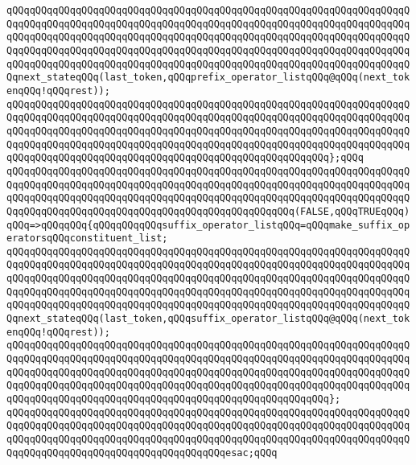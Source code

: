 \newline
\verb|qQQqqQQqqQQqqQQqqQQqqQQqqQQqqQQqqQQqqQQqqQQqqQQqqQQqqQQqqQQqqQQqqQQqqQQqqQQqqQQqqQQqqQQqqQQqqQQqqQQqqQQqqQQqqQQqqQQqqQQqqQQqqQQqqQQqqQQqqQQqqQQqqQQqqQQqqQQqqQQqqQQqqQQqqQQqqQQqqQQqqQQqqQQqqQQqqQQqqQQqqQQqqQQqqQQqqQQqqQQqqQQqqQQqqQQqqQQqqQQqqQQqqQQqqQQqqQQqqQQqqQQqqQQqqQQqqQQqqQQqqQQqqQQqqQQqqQQqqQQqqQQqqQQqqQQqqQQqqQQqqQQqqQQqqQQqqQQqqQQqqQQqqQQqqQQqnext_stateqQQq(last_token,qQQqprefix_operator_listqQQq@qQQq(next_tokenqQQq!qQQqrest));|\newline
\verb|qQQqqQQqqQQqqQQqqQQqqQQqqQQqqQQqqQQqqQQqqQQqqQQqqQQqqQQqqQQqqQQqqQQqqQQqqQQqqQQqqQQqqQQqqQQqqQQqqQQqqQQqqQQqqQQqqQQqqQQqqQQqqQQqqQQqqQQqqQQqqQQqqQQqqQQqqQQqqQQqqQQqqQQqqQQqqQQqqQQqqQQqqQQqqQQqqQQqqQQqqQQqqQQqqQQqqQQqqQQqqQQqqQQqqQQqqQQqqQQqqQQqqQQqqQQqqQQqqQQqqQQqqQQqqQQqqQQqqQQqqQQqqQQqqQQqqQQqqQQqqQQqqQQqqQQqqQQqqQQqqQQqqQQqqQQqqQQq};qQQq|\newline
\newline
\verb|qQQqqQQqqQQqqQQqqQQqqQQqqQQqqQQqqQQqqQQqqQQqqQQqqQQqqQQqqQQqqQQqqQQqqQQqqQQqqQQqqQQqqQQqqQQqqQQqqQQqqQQqqQQqqQQqqQQqqQQqqQQqqQQqqQQqqQQqqQQqqQQqqQQqqQQqqQQqqQQqqQQqqQQqqQQqqQQqqQQqqQQqqQQqqQQqqQQqqQQqqQQqqQQqqQQqqQQqqQQqqQQqqQQqqQQqqQQqqQQqqQQqqQQqqQQqqQQqqQQq(FALSE,qQQqTRUEqQQq)qQQq=>qQQqqQQq{qQQqqQQqqQQqsuffix_operator_listqQQq=qQQqmake_suffix_operatorsqQQqconstituent_list;|\newline
\newline
\verb|qQQqqQQqqQQqqQQqqQQqqQQqqQQqqQQqqQQqqQQqqQQqqQQqqQQqqQQqqQQqqQQqqQQqqQQqqQQqqQQqqQQqqQQqqQQqqQQqqQQqqQQqqQQqqQQqqQQqqQQqqQQqqQQqqQQqqQQqqQQqqQQqqQQqqQQqqQQqqQQqqQQqqQQqqQQqqQQqqQQqqQQqqQQqqQQqqQQqqQQqqQQqqQQqqQQqqQQqqQQqqQQqqQQqqQQqqQQqqQQqqQQqqQQqqQQqqQQqqQQqqQQqqQQqqQQqqQQqqQQqqQQqqQQqqQQqqQQqqQQqqQQqqQQqqQQqqQQqqQQqqQQqqQQqqQQqqQQqqQQqqQQqqQQqqQQqnext_stateqQQq(last_token,qQQqsuffix_operator_listqQQq@qQQq(next_tokenqQQq!qQQqrest));|\newline
\verb|qQQqqQQqqQQqqQQqqQQqqQQqqQQqqQQqqQQqqQQqqQQqqQQqqQQqqQQqqQQqqQQqqQQqqQQqqQQqqQQqqQQqqQQqqQQqqQQqqQQqqQQqqQQqqQQqqQQqqQQqqQQqqQQqqQQqqQQqqQQqqQQqqQQqqQQqqQQqqQQqqQQqqQQqqQQqqQQqqQQqqQQqqQQqqQQqqQQqqQQqqQQqqQQqqQQqqQQqqQQqqQQqqQQqqQQqqQQqqQQqqQQqqQQqqQQqqQQqqQQqqQQqqQQqqQQqqQQqqQQqqQQqqQQqqQQqqQQqqQQqqQQqqQQqqQQqqQQqqQQqqQQqqQQqqQQqqQQq};|\newline
\verb|qQQqqQQqqQQqqQQqqQQqqQQqqQQqqQQqqQQqqQQqqQQqqQQqqQQqqQQqqQQqqQQqqQQqqQQqqQQqqQQqqQQqqQQqqQQqqQQqqQQqqQQqqQQqqQQqqQQqqQQqqQQqqQQqqQQqqQQqqQQqqQQqqQQqqQQqqQQqqQQqqQQqqQQqqQQqqQQqqQQqqQQqqQQqqQQqqQQqqQQqqQQqqQQqqQQqqQQqqQQqqQQqqQQqqQQqqQQqqQQqqQQqqQQqesac;qQQq|\newline
